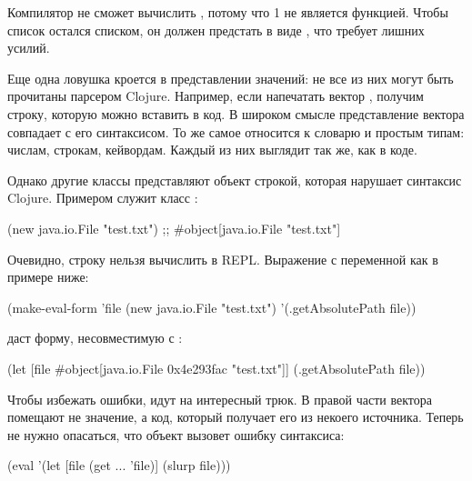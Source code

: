 Компилятор не сможет вычислить , потому что 1 не является функцией. Чтобы список остался списком, он должен предстать в виде , что требует лишних усилий.

Еще одна ловушка кроется в представлении значений: не все из них могут быть прочитаны парсером Clojure. Например, если напечатать вектор \code{[1 2 3]}, получим строку, которую можно вставить в код. В широком смысле представление вектора совпадает с его синтаксисом. То же самое относится к словарю и простым типам: числам, строкам, кейвордам. Каждый из них выглядит так же, как в коде.

Однако другие классы представляют объект строкой, которая нарушает синтаксис Clojure. Примером служит класс :

\begin{english}
  \begin{clojure}
(new java.io.File "test.txt")
;; #object[java.io.File "test.txt"]
  \end{clojure}
\end{english}

Очевидно, строку  нельзя вычислить в REPL. Выражение с переменной  как в примере ниже:

\begin{english}
  \begin{clojure}
(make-eval-form
 {'file (new java.io.File "test.txt")}
 '(.getAbsolutePath file))
  \end{clojure}
\end{english}

\noindent
даст форму, несовместимую с :

\begin{english}
  \begin{clojure}
(let [file #object[java.io.File 0x4e293fac "test.txt"]]
  (.getAbsolutePath file))
  \end{clojure}
\end{english}

Чтобы избежать ошибки, идут на интересный трюк. В правой части вектора  помещают не значение, а код, который получает его из некоего источника. Теперь не нужно опасаться, что объект  вызовет ошибку синтаксиса:

\begin{english}
  \begin{clojure}
(eval '(let [file (get ... 'file)]
         (slurp file)))
  \end{clojure}
\end{english}

